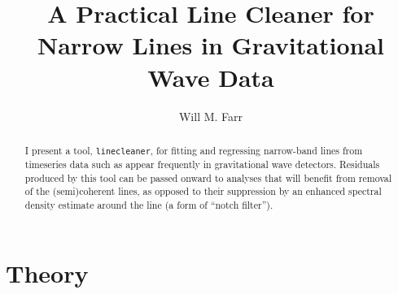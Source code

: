 \documentclass[modern]{aastex631}
\begin{document}
\title{A Practical Line Cleaner for Narrow Lines in Gravitational Wave Data}

\author[0000-0003-1540-8562]{Will M. Farr}

\begin{abstract}
    I present a tool, \texttt{linecleaner}, for fitting and regressing
    narrow-band lines from timeseries data such as appear frequently in
    gravitational wave detectors.  Residuals produced by this tool can be passed
    onward to analyses that will benefit from removal of the (semi)coherent
    lines, as opposed to their suppression by an enhanced spectral density
    estimate around the line (a form of ``notch filter'').
\end{abstract}

\section{Theory}
\label{sec:theory}
\end{document}
